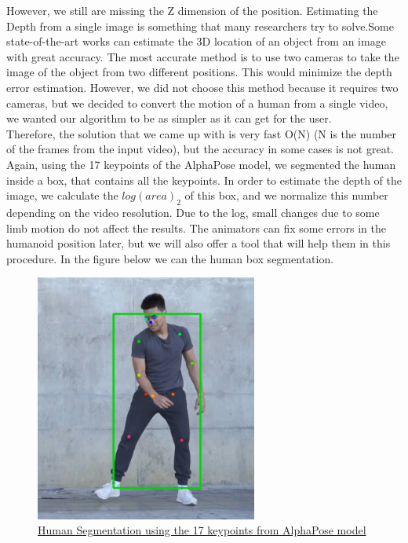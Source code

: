 However, we still are missing the Z dimension of the position. Estimating the Depth from a single image is something that many researchers try to solve.Some state-of-the-art works can estimate the 3D location of an object from an image with great accuracy. The most accurate method is to use two cameras to take the image of the object from two different positions. This would minimize the depth error estimation. However, we did not choose this method because it requires two cameras, but we decided to convert the motion of a human from a single video, we wanted our algorithm to be as simpler as it can get for the user.\\

Therefore, the solution that we came up with is very fast O(N) (N is the number of the frames from the input video), but the accuracy in some cases is not great. Again, using the 17 keypoints of the AlphaPose model, we segmented the human inside a box, that contains all the keypoints. In order to estimate the depth of the image, we calculate the $log(area)_2$ of this box, and we normalize this number depending on the video resolution. Due to the log, small changes due to some limb motion do not affect the results. The animators can fix some errors in the humanoid position later, but we will also offer a tool that will help them in this procedure. In the figure below we can the human box segmentation.

\begin{figure}[h]
	\centering
	\includegraphics[width=0.65\textwidth]{figures/Implementation/position3D.png}
	\captionsetup{labelformat=empty}
	\caption{\href{https://www.pexels.com/search/videos/dance/}
	{Human Segmentation using the 17 keypoints from AlphaPose model}}
\end{figure}

